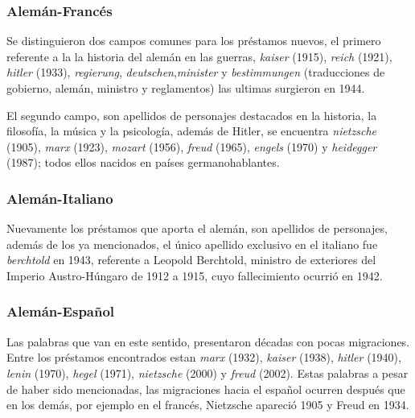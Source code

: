 \subsubsection*{Alemán-Francés}%


Se distinguieron dos campos comunes para los préstamos nuevos,  el primero referente a la  la historia del alemán en las guerras, \textit{kaiser} (1915), \textit{reich} (1921), \textit{hitler} (1933),  \textit{regierung}, \textit{deutschen},\textit{minister} y  \textit{bestimmungen} (traducciones de gobierno, alemán, ministro y reglamentos) las ultimas surgieron en 1944.  

El segundo campo, son apellidos de  personajes destacados en la historia, la filosofía, la música y la psicología, además de Hitler, se encuentra  \textit{nietzsche} (1905),  \textit{marx} (1923),  \textit{mozart} (1956), \textit{freud} (1965), \textit{engels} (1970) y \textit{heidegger} (1987); todos ellos  nacidos en países germanohablantes.

\subsubsection*{Alemán-Italiano}%

Nuevamente los préstamos que aporta el alemán,  son apellidos de personajes,  además de los ya mencionados, el único apellido exclusivo en el italiano fue \textit{berchtold} en 1943, referente a Leopold Berchtold, ministro de exteriores del Imperio Austro-Húngaro de 1912 a 1915, cuyo fallecimiento ocurrió en 1942.


  
\subsubsection*{Alemán-Español}%

Las palabras que van en este sentido,  presentaron  décadas  con pocas migraciones. Entre los préstamos encontrados estan \textit{marx} (1932), \textit{kaiser} (1938), \textit{hitler} (1940), \textit{lenin} (1970), \textit{hegel} (1971),  \textit{nietzsche} (2000) y \textit{freud} (2002). Estas palabras a pesar de haber sido mencionadas,  las migraciones hacia el español ocurren después que en los demás, por ejemplo en el francés,  Nietzsche apareció 1905 y Freud en 1934. 

